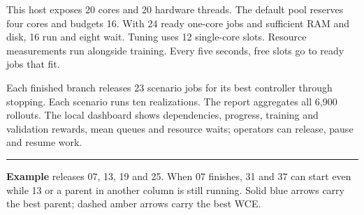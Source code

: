 \documentclass[11pt]{article}
\begin{document}
\begin{minipage}[t]{.47\linewidth}
This host exposes 20 cores and 20 hardware threads. The default pool reserves four cores and budgets 16. With 24 ready one-core jobs and sufficient RAM and disk, 16 run and eight wait. Tuning uses 12 single-core slots. Resource measurements run alongside training. Every five seconds, free slots go to ready jobs that fit.
\end{minipage}\hfill\begin{minipage}[t]{.49\linewidth}
Each finished branch releases 23 scenario jobs for its best controller through stopping. Each scenario runs ten realizations. The report aggregates all 6,900 rollouts. The local dashboard shows dependencies, progress, training and validation rewards, mean queues and resource waits; operators can release, pause and resume work.
\end{minipage}
\medskip\hrule\medskip
{\sffamily\small\textbf{Example} releases 07, 13, 19 and 25. When 07 finishes, 31 and 37 can start even while 13 or a parent in another column is still running. Solid blue arrows carry the best parent; dashed amber arrows carry the best WCE.}
\end{document}
